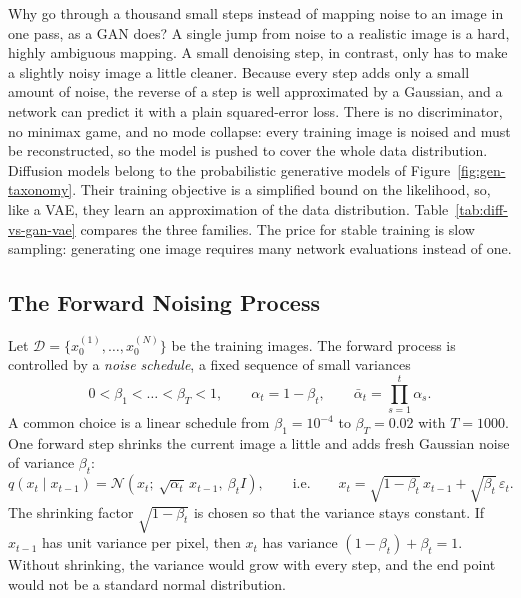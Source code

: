\noindent
Why go through a thousand small steps instead of mapping noise to an image in
one pass, as a GAN does? A single jump from noise to a realistic image is a
hard, highly ambiguous mapping. A small denoising step, in contrast, only has
to make a slightly noisy image a little cleaner. Because every step adds only
a small amount of noise, the reverse of a step is well approximated by a
Gaussian, and a network can predict it with a plain squared-error loss. There
is no discriminator, no minimax game, and no mode collapse: every training
image is noised and must be reconstructed, so the model is pushed to cover the
whole data distribution. Diffusion models belong to the probabilistic
generative models of Figure~\ref{fig:gen-taxonomy}. Their training objective
is a simplified bound on the likelihood, so, like a VAE, they learn an
approximation of the data distribution. Table~\ref{tab:diff-vs-gan-vae}
compares the three families. The price for stable training is slow sampling:
generating one image requires many network evaluations instead of one.

\subsection{The Forward Noising Process}

Let $\mathcal D=\{x_0^{(1)},\dots,x_0^{(N)}\}$ be the training images. The
forward process is controlled by a \emph{noise schedule}, a fixed sequence of
small variances
\begin{equation}
  0<\beta_1<\dots<\beta_T<1,\qquad
  \alpha_t = 1-\beta_t,\qquad
  \bar\alpha_t = \prod_{s=1}^{t}\alpha_s .
  \label{eq:diff-schedule}
\end{equation}
\noindent
A common choice is a linear schedule from $\beta_1=10^{-4}$ to
$\beta_T=0.02$ with $T=1000$. One forward step shrinks the current image a
little and adds fresh Gaussian noise of variance $\beta_t$:
\begin{equation}
  q(x_t\mid x_{t-1}) = \mathcal N\!\left(x_t;\ \sqrt{\alpha_t}\,x_{t-1},\
  \beta_t I\right),
  \qquad\text{i.e.}\qquad
  x_t = \sqrt{1-\beta_t}\,x_{t-1} + \sqrt{\beta_t}\,\varepsilon_t .
  \label{eq:diff-step}
\end{equation}
\noindent
The shrinking factor $\sqrt{1-\beta_t}$ is chosen so that the variance stays
constant. If $x_{t-1}$ has unit variance per pixel, then $x_t$ has variance
$(1-\beta_t)+\beta_t=1$. Without shrinking, the variance would grow with every
step, and the end point would not be a standard normal distribution.

